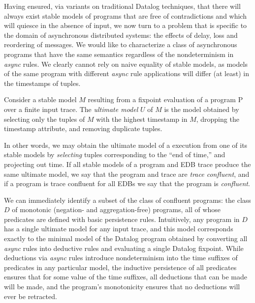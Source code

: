 Having ensured, via variants on traditional Datalog techniques, that there will always exist 
stable models  of \lang programs that are free of contradictions and which will quiesce in the absence of input, we now turn to a problem that is specific to the domain of asynchronous
distributed systems: the effects of delay, loss and reordering of messages. We would like to
characterize a class of asynchronous \lang programs that have the same semantics regardless of
the nondeterminism in {\em async} rules.  We clearly cannot rely on naive equality of stable
models, as models of the same program with different {\em async} rule applications will differ
(at least) in the timestamps of tuples.

\begin{definition}
Consider a stable model $M$ resulting from a fixpoint evaluation of a \lang program P over a finite input trace.  The \emph{ultimate model} $U$ of $M$ is the model obtained by selecting only the tuples of $M$ with the highest timestamp in $M$, dropping the timestamp attribute,
and removing duplicate tuples.
\end{definition}

In other words, we may obtain the ultimate model of a \lang execution from one of its stable
models by {\em selecting} tuples corresponding to the ``end of time,'' and projecting out time.
If all stable models of a \lang program and EDB trace produce the same ultimate model, we say that the program and trace are \emph{trace confluent}, and if a program is trace confluent for all EDBs we say that the program is \emph{confluent}.

We can immediately identify a subset of the class of confluent programs:
the class $D$ of monotonic (negation- and aggregation-free) \lang programs, all of 
whose predicates are defined with basic persistence rules.  Intuitively, any program in $D$
has a single ultimate model for any input trace, and this model corresponds exactly to the
minimal model of the Datalog program obtained by converting all {\em async} rules into deductive rules and evaluating a single Datalog fixpoint.  While deductions via {\em async} 
rules introduce nondeterminism into the time suffixes of predicates in any particular model, 
the inductive persistence of all predicates ensures that for some value of the time suffixes, 
all deductions that can be made will be made, and the program's monotonicity ensures that
no deductions will ever be retracted.   

